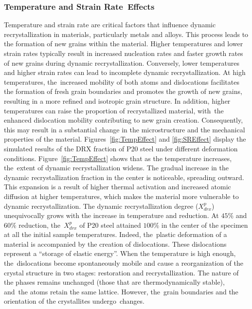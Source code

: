 \documentclass[metals,article,accept,pdftex,moreauthors]{Definitions/mdpi}
\begin{document}
\subsubsection{Temperature and Strain Rate~Effects}\label{subsec:TempSReffect}

Temperature and strain rate are critical factors that influence dynamic recrystallization in materials, particularly metals and alloys.
This process leads to the formation of new grains within the material.
Higher temperatures and lower strain rates typically result in increased nucleation rates and faster growth rates of new grains during dynamic recrystallization.
Conversely, lower temperatures and higher strain rates can lead to incomplete dynamic recrystallization.
At high temperatures, the~increased mobility of both atoms and dislocations facilitates the formation of fresh grain boundaries and promotes the growth of new grains, resulting
in a more refined and isotropic grain structure.
In addition, higher temperatures can raise the proportion of recrystallized material, with~the enhanced dislocation mobility contributing to new grain creation.
Consequently, this may result in a substantial change in the microstructure and the mechanical properties of the material.
Figures~\ref{fig:TempEffect} and \ref{fig:SREffect} display the simulated results of the DRX fraction of P20 steel under different deformation conditions.
Figure~\ref{fig:TempEffect} shows that as the temperature increases, the~extent of dynamic recrystallization widens.
The gradual increase in the dynamic recrystallization fraction in the center is noticeable, spreading outward.
This expansion is a result of higher thermal activation and increased atomic diffusion at higher temperatures, which makes the material more vulnerable to dynamic recrystallization.
The dynamic recrystallization degree ($X_{drx}^{p}$) unequivocally grows with the increase in temperature and reduction.
At $45\%$ and $60\%$ reduction, the~$X_{drx}^{p}$ of P20 steel
attained $100\%$ in the center of the specimen at all the initial sample temperatures.
Indeed, the~plastic deformation of a material is accompanied by the creation of dislocations.
These dislocations represent a ``storage of elastic energy''.
When the temperature is high enough, the~dislocations become spontaneously mobile and cause a reorganization of the crystal structure in two stages: restoration and recrystallization.
The nature of the phases remains unchanged (those that are thermodynamically stable), and~the atoms retain the same lattice.
However, the~grain boundaries and the orientation of the crystallites undergo~changes.
\end{document}
